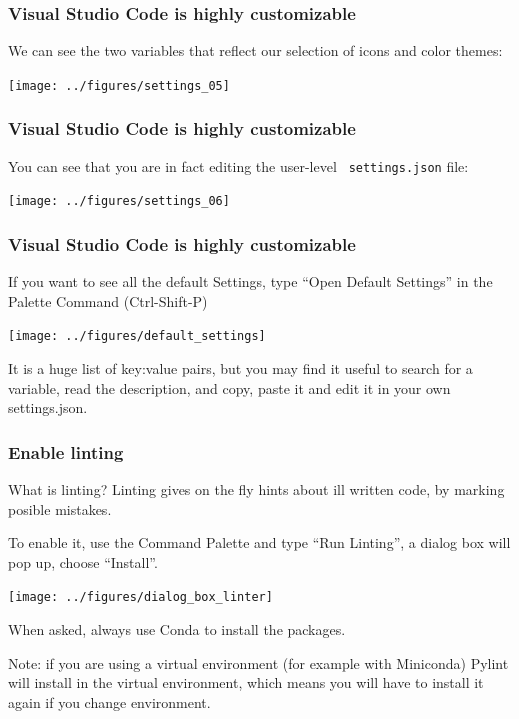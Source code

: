 \documentclass[9pt]{beamer}
\begin{document}
\begin{frame}
  \frametitle{Visual Studio Code is highly customizable}
    \begin{overlayarea}{\textwidth}{\textheight}
      We can see the two variables that reflect our selection of icons and
      color themes:
      \begin{center}
        \texttt{[image: ../figures/settings\_05]}
      \end{center}
  \end{overlayarea}
\end{frame}
\begin{frame}
  \frametitle{Visual Studio Code is highly customizable}
  \begin{overlayarea}{\textwidth}{\textheight}
    You can see that you are in fact editing the user-level {\tt
      settings.json} file:
    \begin{center}
      \texttt{[image: ../figures/settings\_06]}
    \end{center}
  \end{overlayarea}
\end{frame}
\begin{frame}
  \frametitle{Visual Studio Code is highly customizable}
  \begin{overlayarea}{\textwidth}{\textheight}
    If you want to see all the default Settings, type ``Open Default
    Settings'' in the Palette Command (Ctrl-Shift-P) 
    \begin{center}
      \texttt{[image: ../figures/default\_settings]}
    \end{center}
    It is a huge list of key:value pairs, but you may find  it useful to search for
    a variable, read the description, and copy, paste it and edit it  in your own
    settings.json.
  \end{overlayarea}
\end{frame}
\begin{frame}
  \frametitle{Enable linting}
  \begin{block}{What is linting?}
    Linting gives on the fly hints about ill written code, by marking
  posible mistakes. 
  \end{block}
  To enable it, use the Command Palette and type ``Run Linting'', a
  dialog box will pop up, choose ``Install''.
  \begin{center}
    \texttt{[image: ../figures/dialog\_box\_linter]}
  \end{center}\pause
  When asked, always use Conda to install the packages.\pause
  \begin{block}{Note: if you are using a virtual environment (for example
      with Miniconda)}
    Pylint will install in the virtual environment, which means you
    will have to install it again if you change environment.
  \end{block}
\end{frame}
\end{document}
